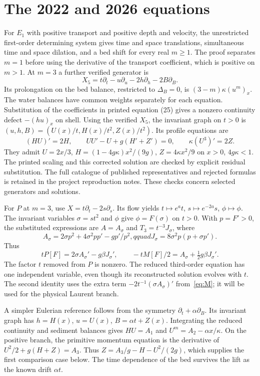 \documentclass[12pt,a4paper,oneside]{report}
\numberwithin{equation}{chapter}
\theoremstyle{remark}\newtheorem{remark}[theorem]{Remark}
\begin{document}
\section{The 2022 and 2026 equations}
For $E_1$ with positive transport and positive depth and velocity, the unrestricted first-order determining system gives time and space translations, simultaneous time and space dilation, and a bed shift for every real $m\ge1$. The proof separates $m=1$ before using the derivative of the transport coefficient, which is positive on $m>1$. At $m=3$ a further verified generator is
\[
 X_5=t\partial_t-u\partial_u-2h\partial_h-2B\partial_B .
\]
Its prolongation on the bed balance, restricted to $\Delta_B=0$, is $(3-m)\kappa(u^m)_x$. The water balances have common weights separately for each equation. Substitution of the coefficients in printed equation (25) gives a nonzero continuity defect $-(hu)_x$ on shell. Using the verified $X_5$, the invariant graph on $t>0$ is $(u,h,B)=(U(x)/t,H(x)/t^2,Z(x)/t^2)$. Its profile equations are
\[
 (HU)'=2H,\qquad UU'-U+g(H'+Z')=0,\qquad \kappa(U^3)'=2Z .
\]
They admit $U=2x/3$, $H=(1-4g\kappa)x^2/(9g)$, $Z=4\kappa x^2/9$ on $x>0$, $4g\kappa<1$. The printed scaling and this corrected solution are checked by explicit residual substitution. The full catalogue of published representatives and rejected formulas is retained in the project reproduction notes. These checks concern selected generators and solutions.

For $P$ at $m=3$, use $X=t\partial_t-2s\partial_s$. Its flow yields $t\mapsto e^a t$, $s\mapsto e^{-2a}s$, $\phi\mapsto\phi$. The invariant variables $\sigma=st^2$ and $\phi$ give $\phi=F(\sigma)$ on $t>0$. With $p=F'>0$, the substituted expressions are $A=A_\sigma$ and $T_3=t^{-3}J_\sigma$, where
\begin{equation}\label{eq:cubic-terms}
 A_\sigma=2\sigma p^2+4\sigma^2pp'-gp'/p^2,qquad
 J_\sigma=8\sigma^2 p(p+\sigma p').
\end{equation}
Thus
\begin{equation}\label{eq:cubic-reduced}
 tP[F]=2\sigma A_\sigma'-g\beta J_\sigma',\qquad
 -t M[F]/2=A_\sigma+\tfrac12g\beta J_\sigma' .
\end{equation}
The factor $t$ removed from $P$ is nonzero. The reduced third-order equation has one independent variable, even though its reconstructed solution evolves with $t$. The second identity uses the extra term $-2t^{-1}(\sigma A_\sigma)'$ from~\eqref{eq:M}; it will be used for the physical Laurent branch.


A simpler Eulerian reference follows from the symmetry
$\partial_t+\alpha\partial_B$. Its invariant graph has $h=H(x)$, $u=U(x)$,
$B=\alpha t+Z(x)$. Integrating the reduced continuity and sediment balances
gives $HU=A_1$ and $U^m=A_2-\alpha x/\kappa$. On the positive branch,
the primitive momentum equation is the derivative of
$U^2/2+g(H+Z)=A_3$. Thus $Z=A_3/g-H-U^2/(2g)$, which supplies the first
comparison case below. The time dependence of the bed survives the lift
as the known drift $\alpha t$.
\end{document}
